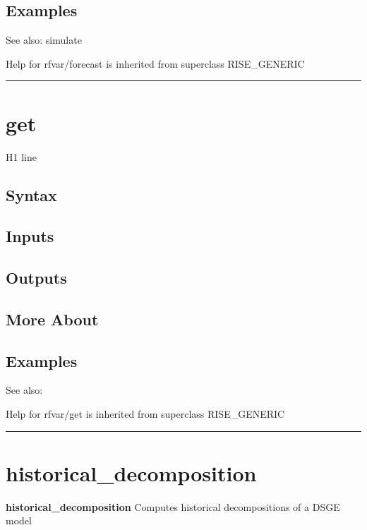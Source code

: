 \documentclass[letterpaper,10pt,english]{sphinxmanual}
\begin{document}
\subsection{Examples}
\label{classes/models/@rfvar/rfvar:id30}
See also: simulate

Help for rfvar/forecast is inherited from superclass RISE\_GENERIC


\bigskip\hrule{}\bigskip



\section{get}
\label{classes/models/@rfvar/rfvar:id31}\label{classes/models/@rfvar/rfvar:get}
H1 line


\subsection{Syntax}
\label{classes/models/@rfvar/rfvar:id32}

\subsection{Inputs}
\label{classes/models/@rfvar/rfvar:id33}

\subsection{Outputs}
\label{classes/models/@rfvar/rfvar:id34}

\subsection{More About}
\label{classes/models/@rfvar/rfvar:id35}

\subsection{Examples}
\label{classes/models/@rfvar/rfvar:id36}
See also:

Help for rfvar/get is inherited from superclass RISE\_GENERIC


\bigskip\hrule{}\bigskip



\section{historical\_decomposition}
\label{classes/models/@rfvar/rfvar:id37}\label{classes/models/@rfvar/rfvar:historical-decomposition}
\textbf{historical\_decomposition} Computes historical decompositions of a DSGE model
\end{document}

